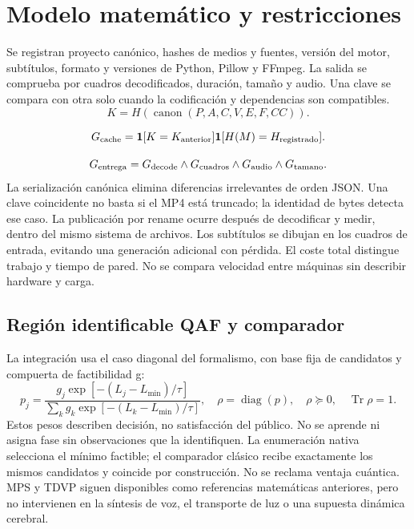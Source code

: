 \documentclass[10pt,a4paper]{article}
\begin{document}
\section{Modelo matemático y restricciones}
Se registran proyecto canónico, hashes de medios y fuentes, versión del motor, subtítulos, formato y versiones de Python, Pillow y FFmpeg. La salida se comprueba por cuadros decodificados, duración, tamaño y audio. Una clave se compara con otra solo cuando la codificación y dependencias son compatibles.
\begin{equation}K=H(\operatorname{canon}(P,A,C,V,E,F,CC)).\end{equation}

\begin{equation}G_{\rm cache}=\mathbf1[K=K_{\rm anterior}]\mathbf1[H(M)=H_{\rm registrado}].\end{equation}

\begin{equation}G_{\rm entrega}=G_{\rm decode}\land G_{\rm cuadros}\land G_{\rm audio}\land G_{\rm tamano}.\end{equation}
La serialización canónica elimina diferencias irrelevantes de orden JSON. Una clave coincidente no basta si el MP4 está truncado; la identidad de bytes detecta ese caso. La publicación por rename ocurre después de decodificar y medir, dentro del mismo sistema de archivos. Los subtítulos se dibujan en los cuadros de entrada, evitando una generación adicional con pérdida. El coste total distingue trabajo y tiempo de pared. No se compara velocidad entre máquinas sin describir hardware y carga.
\subsection{Región identificable QAF y comparador}
La integración usa el caso diagonal del formalismo, con base fija de candidatos y compuerta de factibilidad g:
\begin{equation}
p_j=\frac{g_j\exp[-(L_j-L_{\min})/\tau]}{\sum_k g_k\exp[-(L_k-L_{\min})/\tau]},\quad\rho=\operatorname{diag}(p),\quad\rho\succeq0,\quad\operatorname{Tr}\rho=1.
\end{equation}
Estos pesos describen decisión, no satisfacción del público. No se aprende ni asigna fase sin observaciones que la identifiquen. La enumeración nativa selecciona el mínimo factible; el comparador clásico recibe exactamente los mismos candidatos y coincide por construcción. No se reclama ventaja cuántica. MPS y TDVP siguen disponibles como referencias matemáticas anteriores, pero no intervienen en la síntesis de voz, el transporte de luz o una supuesta dinámica cerebral.
\end{document}
